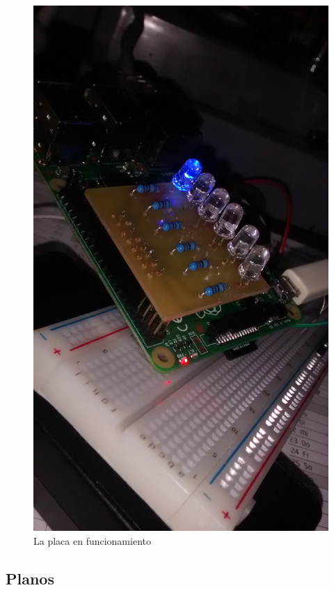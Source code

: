 \documentclass{article}
\begin{document}
\begin{figure}[H]
\includegraphics[height=0.27\textheight]{led/vista6}
\caption{La placa en funcionamiento}
\end{figure}

\newpage
\subsection{Planos}
\end{document}
